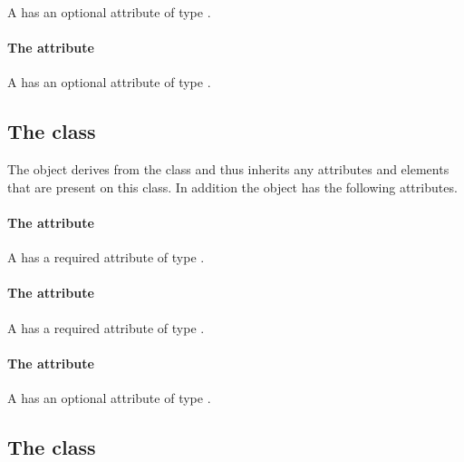 A \RenderCurve has an optional attribute  of type
.

\paragraph{The \fixttspace{} attribute}

A \RenderCurve has an optional attribute  of type
.

\subsection{The  class}
\label{renderpoint-class}


The \RenderPoint object derives from the  class and thus
inherits any attributes and elements that are present on this class.
In addition the \RenderPoint object has the following attributes.

\paragraph{The \fixttspace{} attribute}

A \RenderPoint has a required attribute  of type \RelAbsVector.

\paragraph{The \fixttspace{} attribute}

A \RenderPoint has a required attribute  of type \RelAbsVector.

\paragraph{The \fixttspace{} attribute}

A \RenderPoint has an optional attribute  of type
\RelAbsVector.

\subsection{The  class}
\label{text-class}

